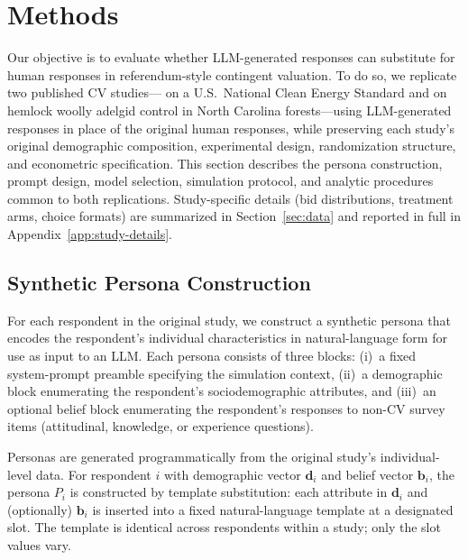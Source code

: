 \documentclass[12pt]{article}
\begin{document}
%

\section{Methods}\label{sec:methods}

Our objective is to evaluate whether LLM-generated responses can substitute
for human responses in referendum-style contingent valuation. To do so, we
replicate two published CV studies---\textcite{Aldy2012} on a U.S.\ National
Clean Energy Standard and \textcite{Giguere2020} on hemlock woolly adelgid
control in North Carolina forests---using LLM-generated responses in place
of the original human responses, while preserving each study's original
demographic composition, experimental design, randomization structure, and
econometric specification. This section describes the persona construction,
prompt design, model selection, simulation protocol, and analytic procedures
common to both replications. Study-specific details (bid distributions,
treatment arms, choice formats) are summarized in Section~\ref{sec:data}
and reported in full in Appendix~\ref{app:study-details}.

\subsection{Synthetic Persona Construction}\label{sec:methods-persona}

For each respondent in the original study, we construct a synthetic persona
that encodes the respondent's individual characteristics in natural-language
form for use as input to an LLM. Each persona consists of three blocks:
(i)~a fixed system-prompt preamble specifying the simulation context,
(ii)~a demographic block enumerating the respondent's sociodemographic
attributes, and (iii)~an optional belief block enumerating the respondent's
responses to non-CV survey items (attitudinal, knowledge, or experience
questions).

Personas are generated programmatically from the original study's
individual-level data. For respondent $i$ with demographic vector
$\mathbf{d}_i$ and belief vector $\mathbf{b}_i$, the persona $P_i$ is
constructed by template substitution: each attribute in $\mathbf{d}_i$ and
(optionally) $\mathbf{b}_i$ is inserted into a fixed natural-language template at a designated slot. The template is identical across respondents within a study; only the slot values vary.
\end{document}
